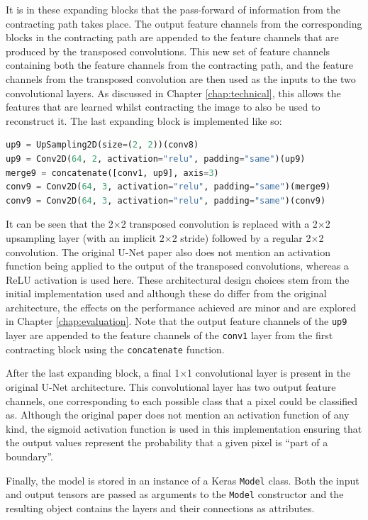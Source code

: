 It is in these expanding blocks that the pass-forward of information from the contracting path takes place. The output feature channels from the corresponding blocks in the contracting path are appended to the feature channels that are produced by the transposed convolutions. This new set of feature channels containing both the feature channels from the contracting path, and the feature channels from the transposed convolution are then used as the inputs to the two convolutional layers. As discussed in Chapter \ref{chap:technical}, this allows the features that are learned whilst contracting the image to also be used to reconstruct it. The last expanding block is implemented like so:
\begin{lstlisting}[language=Python,upquote=true,belowskip=0pt]
up9 = UpSampling2D(size=(2, 2))(conv8)
up9 = Conv2D(64, 2, activation="relu", padding="same")(up9)
merge9 = concatenate([conv1, up9], axis=3)
conv9 = Conv2D(64, 3, activation="relu", padding="same")(merge9)
conv9 = Conv2D(64, 3, activation="relu", padding="same")(conv9)
\end{lstlisting}
It can be seen that the 2$\times$2 transposed convolution is replaced with a 2$\times$2 upsampling layer (with an implicit 2$\times$2 stride) followed by a regular 2$\times$2 convolution. The original U-Net paper also does not mention an activation function being applied to the output of the transposed convolutions, whereas a ReLU activation is used here. These architectural design choices stem from the initial implementation used and although these do differ from the original architecture, the effects on the performance achieved are minor and are explored in Chapter \ref{chap:evaluation}. Note that the output feature channels of the \texttt{up9} layer are appended to the feature channels of the \texttt{conv1} layer from the first contracting block using the \texttt{concatenate} function.

After the last expanding block, a final 1$\times$1 convolutional layer is present in the original U-Net architecture. This convolutional layer has two output feature channels, one corresponding to each possible class that a pixel could be classified as. Although the original paper does not mention an activation function of any kind, the sigmoid activation function is used in this implementation ensuring that the output values represent the probability that a given pixel is ``part of a boundary''.

Finally, the model is stored in an instance of a Keras \texttt{Model} class. Both the input and output tensors are passed as arguments to the \texttt{Model} constructor and the resulting object contains the layers and their connections as attributes.

